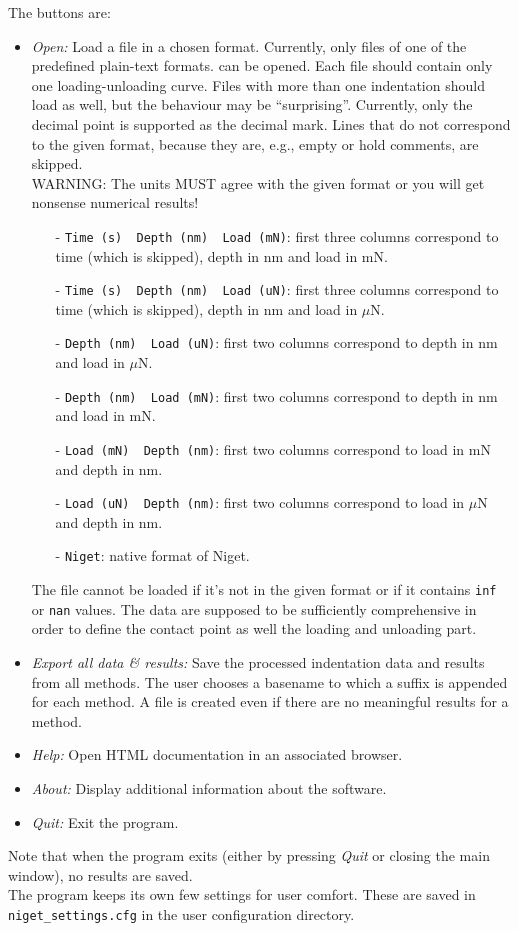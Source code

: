 The buttons are:
\begin{itemize}
 \item \emph{Open:} Load a file in a chosen format. Currently, only files of one of the predefined plain-text formats. can be opened. 
 Each file should contain only one loading-unloading curve. Files with more than one indentation should load as well, but the behaviour may be ``surprising''. Currently, only the decimal point is supported as the decimal mark.
 Lines that do not correspond to the given format, because they are, e.g., empty or hold comments, are skipped. \\
 WARNING: The units MUST agree with the given format or you will get nonsense numerical results! 
 
 \begin{itemize}
 \item[-] \verb|Time (s)  Depth (nm)  Load (mN)|: first three columns correspond to time (which is skipped), depth in nm and load in mN.
 \item[-] \verb|Time (s)  Depth (nm)  Load (uN)|: first three columns correspond to time (which is skipped), depth in nm and load in $\mu$N.
 \item[-] \verb|Depth (nm)  Load (uN)|: first two columns correspond to depth in nm and load in $\mu$N.
 \item[-] \verb|Depth (nm)  Load (mN)|: first two columns correspond to depth in nm and load in mN.
 \item[-] \verb|Load (mN)  Depth (nm)|: first two columns correspond to load in mN and depth in nm.
 \item[-] \verb|Load (uN)  Depth (nm)|: first two columns correspond to load in $\mu$N and depth in nm.
 \item[-] \verb|Niget|: native format of Niget.
 \end{itemize}
 The file cannot be loaded if it's not in the given format or if it contains \verb|inf| or \verb|nan| values. The data are supposed to be sufficiently comprehensive in order to define the contact point as well the loading and unloading part.

 \item \emph{Export all data \& results:} Save the processed indentation data and  results from all methods. The user chooses a basename to which a suffix is appended for each method. A file is created even if there are no meaningful results for a method. 
 \item \emph{Help:} Open HTML documentation in an associated browser.
 \item \emph{About:} Display additional information about the software.
 \item \emph{Quit:} Exit the program.
\end{itemize}

Note that when the program exits (either by pressing \emph{Quit} or closing the main window), no results are saved. \\
The program keeps its own few settings for user comfort. These are saved in \verb|niget_settings.cfg| in the user configuration directory. 
